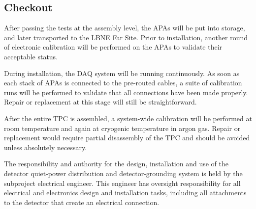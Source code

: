\subsection{Checkout } 
\label{sec:v5-tpc-checkout-checkout}

After passing the tests at the assembly level, the APAs will be put into storage, and later transported to the LBNE Far Site. Prior to installation, another round of electronic calibration will be performed on the APAs to validate their acceptable status. 

During installation, the DAQ system will be running continuously. As soon as each stack of APAs is connected to the pre-routed cables, a suite of calibration runs will be performed to validate that all connections have been made properly. Repair or replacement at this stage will still be straightforward. 

After the entire TPC is assembled, a system-wide calibration will be performed at room temperature and again at cryogenic temperature in argon gas. Repair or replacement would require partial disassembly of the TPC and should be avoided unless absolutely necessary. 

The responsibility and authority for the design, installation and use of the detector quiet-power distribution and detector-grounding system is held by the subproject electrical engineer. This engineer has oversight responsibility for all electrical and electronics design and installation tasks, including all attachments to the detector that create an electrical connection. 




